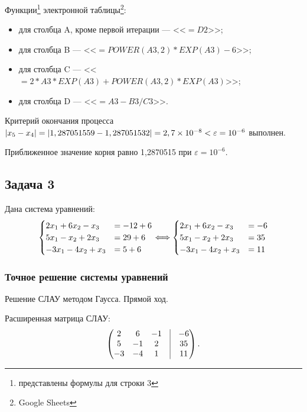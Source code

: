 \documentclass[10pt, a4paper, titlepage]{article}
\newcommand*{\hm}[1]{#1\nobreak\discretionary{}{\hbox{$\mathsurround=0pt #1$}}{}} %
\begin{document}
Функции\footnote{представлены формулы для строки 3} электронной таблицы\footnote{Google Sheets}:
\begin{itemize}
    \item для столбца A, кроме первой итерации --- <<$=D2$>>;
    
    \item для столбца B --- <<$=POWER(A3,2)*EXP(A3)-6$>>;
    
    \item для столбца C --- <<$=2*A3*EXP(A3)+POWER(A3,2)*EXP(A3)$>>;
    
    \item для столбца D --- <<$=A3-B3/C3$>>.
\end{itemize}

Критерий окончания процесса $|x_5-x_4|=|1,287051559-1,287051532 | \hm =2,7\times10^{-8}<\varepsilon=10^{-6}$ выполнен. 

Приближенное значение корня равно 1,2870515 при $\varepsilon=10^{-6}$.

\subsection{Задача 3}

Дана система уравнений:
\begin{equation*}
    \begin{cases}
        $$2x_1+6x_2-x_3 &= -12+6$$ \\
        $$5x_1-x_2+2x_3 &= 29+6$$ \\
        $$-3x_1-4x_2+x_3 &= 5+6$$
    \end{cases}
    \Longleftrightarrow
    \begin{cases}
        $$2x_1+6x_2-x_3 &= -6$$ \\
        $$5x_1-x_2+2x_3 &= 35$$ \\
        $$-3x_1-4x_2+x_3 &= 11$$
    \end{cases}
\end{equation*}


\subsubsection*{Точное решение системы уравнений}

Решение СЛАУ методом Гаусса. Прямой ход.

Расширенная матрица СЛАУ:
\begin{equation*}
    \begin{pmatrix}
        2 & 6 & -1 & \vrule & -6 \\
        5 & -1 & 2 & \vrule & 35 \\
        -3 & -4 & 1 & \vrule & 11
    \end{pmatrix}.
\end{equation*}
\end{document}
